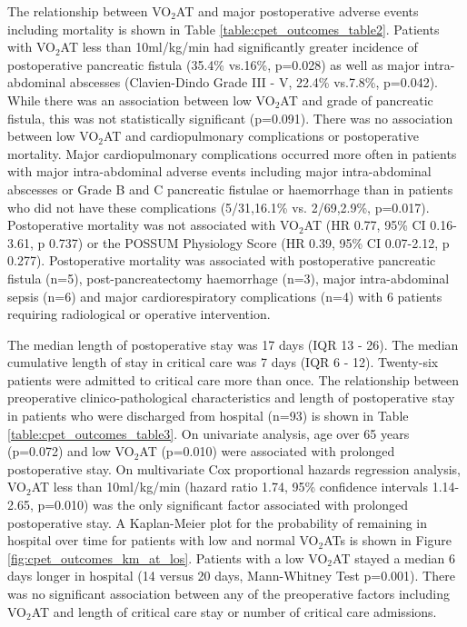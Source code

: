 The relationship between VO$_2$AT and major postoperative adverse events including mortality is shown in Table \ref{table:cpet_outcomes_table2}. 
Patients with VO$_2$AT less than 10ml/kg/min had significantly greater incidence of postoperative pancreatic fistula (35.4\% vs.16\%, p=0.028) as well as major intra-abdominal abscesses (Clavien-Dindo Grade III - V, 22.4\% vs.7.8\%, p=0.042). 
While there was an association between low VO$_2$AT and grade of pancreatic fistula, this was not statistically significant (p=0.091). 
There was no association between low VO$_2$AT and cardiopulmonary complications or postoperative mortality. 
Major cardiopulmonary complications occurred more often in patients with major intra-abdominal adverse events including major intra-abdominal abscesses or Grade B and C pancreatic fistulae or haemorrhage than in patients who did not have these complications (5/31,16.1\% vs. 2/69,2.9\%, p=0.017). 
Postoperative mortality was not associated with VO$_2$AT (HR 0.77, 95\% CI 0.16-3.61, p 0.737) or the POSSUM Physiology Score (HR 0.39, 95\% CI 0.07-2.12, p 0.277). 
Postoperative mortality was associated with postoperative pancreatic fistula (n=5), post-pancreatectomy haemorrhage (n=3), major intra-abdominal sepsis (n=6) and major cardiorespiratory complications (n=4) with 6 patients requiring radiological or operative intervention.



The median length of postoperative stay was 17 days (IQR 13 - 26). 
The median cumulative length of stay in critical care was 7 days (IQR 6 - 12). 
Twenty-six patients were admitted to critical care more than once. 
The relationship between preoperative clinico-pathological characteristics and length of postoperative stay in patients who were discharged from hospital (n=93) is shown in Table \ref{table:cpet_outcomes_table3}. 
On univariate analysis, age over 65 years (p=0.072) and low VO$_2$AT (p=0.010) were associated with prolonged postoperative stay. 
On multivariate Cox proportional hazards regression analysis, VO$_2$AT less than 10ml/kg/min (hazard ratio 1.74, 95\% confidence intervals 1.14-2.65, p=0.010) was the only significant factor associated with prolonged postoperative stay. 
A Kaplan-Meier plot for the probability of remaining in hospital over time for patients with low and normal VO$_2$ATs is shown in Figure \ref{fig:cpet_outcomes_km_at_los}. 
Patients with a low VO$_2$AT stayed a median 6 days longer in hospital (14 versus 20 days, Mann-Whitney Test p=0.001). 
There was no significant association between any of the preoperative factors including VO$_2$AT and length of critical care stay or number of critical care admissions.


